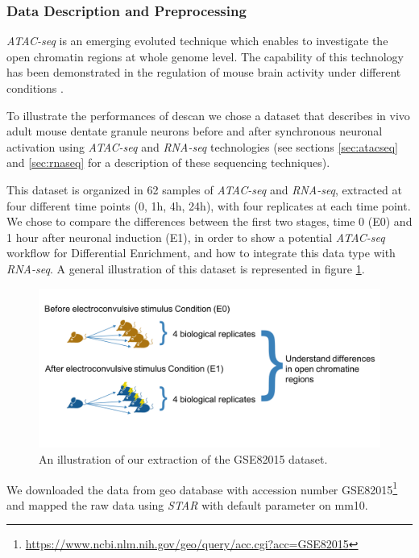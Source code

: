 \subsubsection{Data Description and Preprocessing}
\textit{ATAC-seq} is an emerging evoluted technique which enables to investigate the open chromatin regions at whole genome level.
The capability of this technology has been demonstrated in the regulation of mouse brain activity under different conditions \cite{Su2017}.

To illustrate the performances of \gls{descan} we chose a dataset \cite{Su2017} that describes in vivo adult mouse dentate granule neurons before and after synchronous neuronal activation using \textit{ATAC-seq} and \textit{RNA-seq} technologies (see sections \ref{sec:atacseq} and \ref{sec:rnaseq} for a description of these sequencing techniques).

This dataset is organized in 62 samples of \textit{ATAC-seq} and \textit{RNA-seq}, extracted at four different time points (0, 1h, 4h, 24h), with four replicates at each time point.
We chose to compare the differences between the first two stages, time 0 (E0) and 1 hour after neuronal induction (E1), in order to show a potential \textit{ATAC-seq} workflow for Differential Enrichment, and how to integrate this data type with \textit{RNA-seq}. A general illustration of this dataset is represented in figure \ref{fig:atacdataset}.

\begin{figure}[H]
\includegraphics[width=\textwidth,height=\textheight,keepaspectratio]{img/descan2/dataset.png}
\caption[DEScan2 dataset illustration]{An illustration of our extraction of the GSE82015\cite{Su2017} dataset.}
\label{fig:atacdataset}
\centering
\end{figure}

We downloaded the data from \gls{geo} database \cite{Edgar2002, Barrett2013} with accession number GSE82015\footnote{\url{https://www.ncbi.nlm.nih.gov/geo/query/acc.cgi?acc=GSE82015}} and mapped the raw data using \textit{STAR} \cite{Dobin2013} with default parameter on \gls{mm10}.

